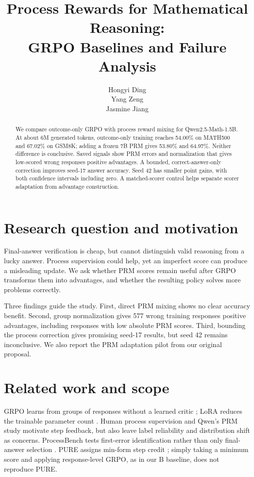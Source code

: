 \documentclass{article}
\title{Process Rewards for Mathematical Reasoning:\\GRPO Baselines and Failure Analysis}
\author{Hongyi Ding \\
\And Yang Zeng \\
\And Jasmine Jiang \\
}
\begin{document}
\maketitle

\begin{abstract}
We compare outcome-only GRPO with process reward mixing for Qwen2.5-Math-1.5B. At about 6M generated tokens, outcome-only training reaches 54.00\% on MATH500 and 67.02\% on GSM8K; adding a frozen 7B PRM gives 53.80\% and 64.97\%. Neither difference is conclusive. Saved signals show PRM errors and normalization that gives low-scored wrong responses positive advantages. A bounded, correct-answer-only correction improves seed-17 answer accuracy. Seed 42 has smaller point gains, with both confidence intervals including zero. A matched-scorer control helps separate scorer adaptation from advantage construction.
\end{abstract}

\section{Research question and motivation}
Final-answer verification is cheap, but cannot distinguish valid reasoning from a lucky answer. Process supervision could help, yet an imperfect score can produce a misleading update. We ask whether PRM scores remain useful after GRPO transforms them into advantages, and whether the resulting policy solves more problems correctly.

Three findings guide the study. First, direct PRM mixing shows no clear accuracy benefit. Second, group normalization gives 577 wrong training responses positive advantages, including responses with low absolute PRM scores. Third, bounding the process correction gives promising seed-17 results, but seed 42 remains inconclusive. We also report the PRM adaptation pilot from our original proposal.

\section{Related work and scope}
GRPO learns from groups of responses without a learned critic \citep{shao2024}; LoRA reduces the trainable parameter count \citep{hu2021}. Human process supervision \citep{lightman2023} and Qwen's PRM study \citep{zhang2025} motivate step feedback, but also leave label reliability and distribution shift as concerns. ProcessBench tests first-error identification rather than only final-answer selection \citep{zheng2024}. PURE assigns min-form step credit \citep{cheng2025}; simply taking a minimum score and applying response-level GRPO, as in our B baseline, does not reproduce PURE.
\end{document}
